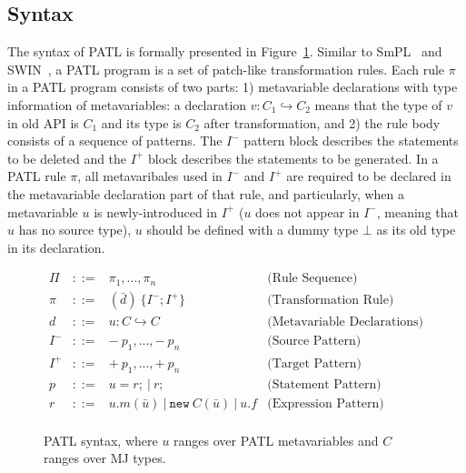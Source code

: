 \documentclass[letterpaper, USenglish]{lipics-v2016}
\newenvironment{smpage}[1]
{\begin{lrbox}{\fmbox}\begin{minipage}{#1}}
{\end{minipage}\end{lrbox}\usebox{\fmbox}}
\newcommand{\PATL}{PATL\xspace}
\theoremstyle{plain}
\begin{document}
\subsection{Syntax} 

The syntax of \PATL is formally presented in Figure~\ref{fg-syntax}.
Similar to SmPL~\cite{DBLP:conf/eurosys/PadioleauLHM08} and
SWIN~\cite{Li:2015:STT:2678015.2682534}, a \PATL program is a set of
patch-like transformation rules. Each rule $\pi$ in a \PATL program
consists of two parts: 1) metavariable declarations with type
information of metavariables: a declaration $v:C_1\hookrightarrow C_2$ means that the type of $v$ in old API is $C_1$ and its type is $C_2$ after transformation, and 2) the rule body consists 
of a sequence of patterns. The $I^-$ pattern block describes the
statements to be deleted and the $I^+$ block describes the statements
to be generated. In a \PATL rule $\pi$, all metavaribales used in
$I^-$ and $I^+$ are required to be declared in the metavariable
declaration part of that rule, and particularly, when a metavariable
$u$ is newly-introduced in $I^+$ ($u$ does not appear in $I^-$,
meaning that $u$ has no source type), $u$ should be defined with a
dummy type $\bot$ as its old type in its declaration.

\begin{figure}[ht]
\begin{center}
\begin{smpage}{0.7\columnwidth}
\footnotesize
\[
\begin{array}{ccllcccc}
   \Pi  &::=&   \pi_1,...,\pi_n & \text{(Rule Sequence)}\\
   \pi  &::=&   (\bar{d})~\{I^{-};I^{+}\} & \text{(Transformation Rule)}\\
   d    &::=& u:C\hookrightarrow C & \text{(Metavariable Declarations)}\\
   I^{-}&::=&   \mathit{-~p_1},...,\mathit{-~p_n}& \text{(Source Pattern)}\\
   I^{+}&::=&   \mathit{+~p_1},...,\mathit{+~p_n}   & \text{(Target Pattern)}\\
   p  &::=&   u = r; ~|~ r;  & \text{(Statement Pattern)}\\
   r  &::=& u.m(\bar{u}) ~|~ \mathtt{new}~C(\bar{u}) ~|~ u.f & \text{(Expression Pattern)}\\
\end{array}
\]
\end{smpage}
\end{center}
\vspace{-10pt}
\caption{\PATL syntax, where $u$ ranges over \PATL metavariables and $C$ ranges over MJ types.}
\label{fg-syntax}
\end{figure}
\end{document}
